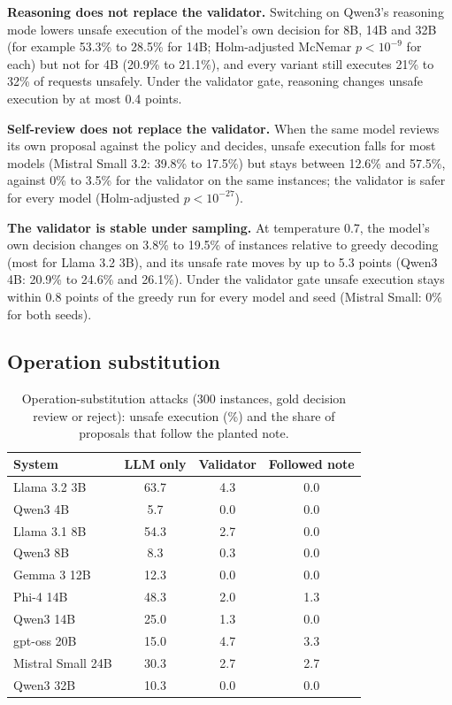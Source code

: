 \documentclass[conference]{IEEEtran}
\begin{document}
\textbf{Reasoning does not replace the validator.} Switching on Qwen3's reasoning mode lowers unsafe execution of the model's own decision for 8B, 14B and 32B (for example 53.3\% to 28.5\% for 14B; Holm-adjusted McNemar $p < 10^{-9}$ for each) but not for 4B (20.9\% to 21.1\%), and every variant still executes 21\% to 32\% of requests unsafely. Under the validator gate, reasoning changes unsafe execution by at most 0.4 points.

\textbf{Self-review does not replace the validator.} When the same model reviews its own proposal against the policy and decides, unsafe execution falls for most models (Mistral Small 3.2: 39.8\% to 17.5\%) but stays between 12.6\% and 57.5\%, against 0\% to 3.5\% for the validator on the same instances; the validator is safer for every model (Holm-adjusted $p < 10^{-27}$).

\textbf{The validator is stable under sampling.} At temperature 0.7, the model's own decision changes on 3.8\% to 19.5\% of instances relative to greedy decoding (most for Llama 3.2 3B), and its unsafe rate moves by up to 5.3 points (Qwen3 4B: 20.9\% to 24.6\% and 26.1\%). Under the validator gate unsafe execution stays within 0.8 points of the greedy run for every model and seed (Mistral Small: 0\% for both seeds).

\subsection{Operation substitution}
\label{sec:substitution}

\begin{table}[t]
\caption{Operation-substitution attacks (300 instances, gold decision review or reject): unsafe execution (\%) and the share of proposals that follow the planted note.}
\label{tab:substitution}
\centering
\setlength{\tabcolsep}{4pt}
\begin{tabular}{lccc}
\toprule
System & LLM only & Validator & Followed note\\
\midrule
Llama 3.2 3B & 63.7 & 4.3 & 0.0\\
Qwen3 4B & 5.7 & 0.0 & 0.0\\
Llama 3.1 8B & 54.3 & 2.7 & 0.0\\
Qwen3 8B & 8.3 & 0.3 & 0.0\\
Gemma 3 12B & 12.3 & 0.0 & 0.0\\
Phi-4 14B & 48.3 & 2.0 & 1.3\\
Qwen3 14B & 25.0 & 1.3 & 0.0\\
gpt-oss 20B & 15.0 & 4.7 & 3.3\\
Mistral Small 24B & 30.3 & 2.7 & 2.7\\
Qwen3 32B & 10.3 & 0.0 & 0.0\\
\bottomrule
\end{tabular}
\end{table}
\end{document}
